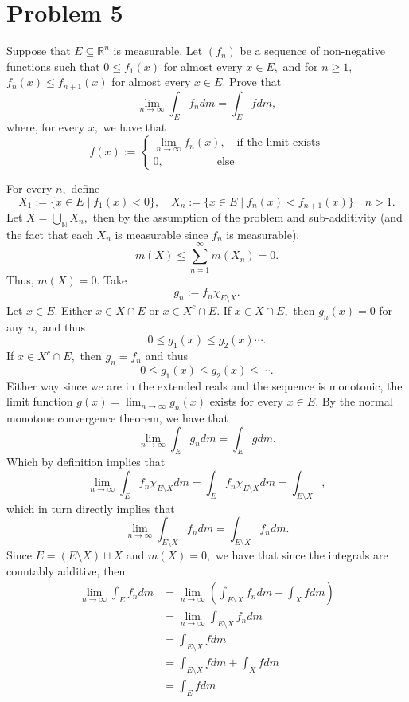 \documentclass[11pt]{article}
\newcommand{\bbN}{\mathbb{N}}
\newcommand{\bbR}{\mathbb{R}}
\newcommand{\sm}{\setminus}
\begin{document}
\section*{Problem 5}
\begin{problem}
    Suppose that $E\subseteq \bbR^n$ is measurable. Let $(f_n)$ be a sequence of non-negative functions such that $0 \leq f_1(x)$ for almost every $x\in E,$ and for $n\geq 1,$ $f_n(x) \leq f_{n + 1}(x)$ for almost every $x\in E.$ Prove that 
    \[\lim_{n\to \infty} \int_E f_ndm = \int_E f dm,\] where, for every $x,$ we have that
    \[f(x):= \begin{cases}
        \displaystyle\lim_{n\to \infty}f_n(x), \quad \text{if the limit exists}\\
        0, \qquad\quad\quad\;\;\: \text{else}
    \end{cases}\]
\end{problem}
\begin{solution}
    For every $n,$ define
    \[X_1 := \{x \in E \mid f_1(x) < 0\}, \quad X_n:=\{x\in E \mid f_n(x) < f_{n+1}(x)\} \quad n >1.\] Let $X = \bigcup_{\bbN}X_n,$ then by the assumption of the problem and sub-additivity (and the fact that each $X_n$ is measurable since $f_n$ is measurable),
    \[m(X)\leq \sum_{n=1}^\infty m(X_n) = 0.\] Thus, $m(X) = 0.$ Take 
    \[g_n:= f_n \chi_{E\sm X}.\] Let $x\in E.$ Either $x\in X \cap E$ or $x\in X^c \cap E.$ If $x\in X\cap E,$ then $g_n(x) = 0$ for any $n,$ and thus 
    \[0 \leq g_1(x) \leq g_2(x)\cdots.\] If $x\in X^c\cap E,$ then $g_n = f_n$ and thus
    \[0 \leq g_1(x) \leq g_2(x) \leq \cdots.\] Either way since we are in the extended reals and the sequence is monotonic, the limit function $g(x) = \displaystyle\lim_{n\to \infty} g_n(x)$ exists for every $x\in E.$ By the normal monotone convergence theorem, we have that 
    \[\lim_{n\to \infty}\int_E g_n dm = \int_E g dm.\] Which by definition implies that 
    \[\lim_{n\to \infty} \int_E f_n \chi_{E\sm X}dm = \int_E f_n \chi_{E\sm X} dm = \int_{E\sm X},\] which in turn directly implies that 
    \[\lim_{n\to \infty} \int_{E\sm X} f_n dm = \int_{E\sm X} f_n dm.\] Since $E = (E\sm X) \sqcup X$ and $m(X) = 0,$ we have that since the integrals are countably additive, then 
    \begin{align*}
        \lim_{n\to \infty}\int_E f_n dm &= \lim_{n\to \infty} \left(\int_{E\sm X} f_n dm + \int_X f dm\right)\\
        &= \lim_{n\to \infty} \int_{E\sm X}f_n dm\\
        &=\int_{E\sm X} f dm\\
        &= \int_{E\sm X} f dm + \int_X fdm\\
        &= \int_E fdm
    \end{align*}
\end{solution}
\end{document}
